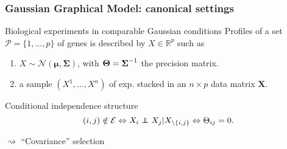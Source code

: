 \begin{frame}
  \frametitle{Gaussian Graphical Model: canonical settings}

  \begin{block}{Biological experiments in comparable Gaussian conditions}
    Profiles  of  a set  $\mathcal{P}  =  \{1,\dots,p\}$  of genes  is
    described by $X\in\mathbb{R}^p$ such as
    \begin{enumerate}
    \item  $X\sim\mathcal{N}(\boldsymbol\mu,\boldsymbol\Sigma)$,  with
      $\boldsymbol\Theta = \boldsymbol{\Sigma}^{-1}$ the precision matrix.
    \item a sample $(X^1, \dots, X^n)$ of exp. stacked in an $n\times
      p$ data matrix $\mathbf{X}$.
    \end{enumerate}
  \end{block}

  \begin{overlayarea}{\textwidth}{\textheight}
        
        \begin{block}{Conditional independence structure}
          \vspace{-.4cm}
          \begin{equation*}
            (i,j)  \notin  \mathcal{E}  \Leftrightarrow  X_i  \indep  X_j  |
            X_{\backslash \{i,j\}} \Leftrightarrow \Theta_{ij} = 0.
          \end{equation*}
        \end{block}
        
        \vspace{-.4cm}
        \vspace{-1cm}
        $\rightsquigarrow$ \alert{``Covariance'' selection}
   
  \end{overlayarea}      
\end{frame}

